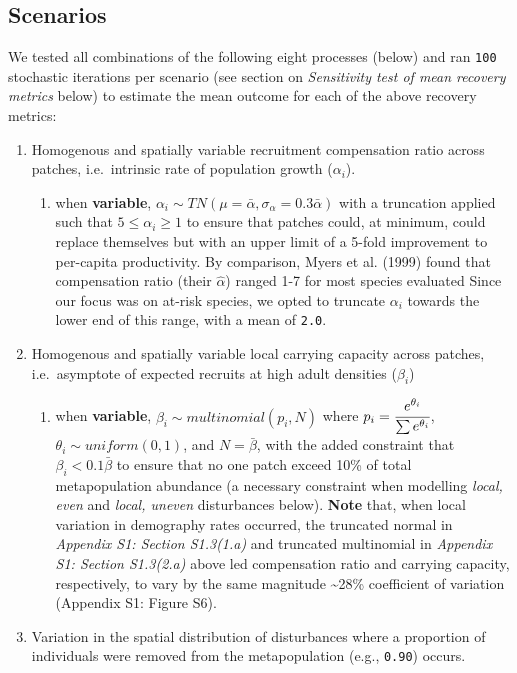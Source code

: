 \documentclass[
]{article}
\providecommand{\tightlist}{%
  \setlength{\itemsep}{0pt}\setlength{\parskip}{0pt}}
\begin{document}
\hypertarget{scenarios}{%
\subsection{Scenarios}\label{scenarios}}

We tested all combinations of the following eight processes (below) and
ran \texttt{100} stochastic iterations per scenario (see section on
\emph{Sensitivity test of mean recovery metrics} below) to estimate the
mean outcome for each of the above recovery metrics:

\begin{enumerate}
\def\labelenumi{\arabic{enumi}.}
\item
  Homogenous and spatially variable recruitment compensation ratio
  across patches, i.e.~intrinsic rate of population growth
  (\(\alpha_i\)).

  \begin{enumerate}
  \def\labelenumii{\alph{enumii}.}
  \tightlist
  \item
    when \textbf{variable},
    \(\alpha_i \sim TN(\mu=\bar{\alpha}, \sigma_{\alpha}=0.3\bar{\alpha})\)
    with a truncation applied such that \(5 \leq \alpha_i \geq 1\) to
    ensure that patches could, at minimum, could replace themselves but
    with an upper limit of a 5-fold improvement to per-capita
    productivity. By comparison, Myers et al. (1999) found that
    compensation ratio (their \(\hat\alpha\)) ranged 1-7 for most
    species evaluated Since our focus was on at-risk species, we opted
    to truncate \(\alpha_i\) towards the lower end of this range, with a
    mean of \texttt{2.0}.
  \end{enumerate}
\item
  Homogenous and spatially variable local carrying capacity across
  patches, i.e.~asymptote of expected recruits at high adult densities
  (\(\beta_i\))

  \begin{enumerate}
  \def\labelenumii{\alph{enumii}.}
  \tightlist
  \item
    when \textbf{variable}, \(\beta_i \sim multinomial(p_i,N)\) where
    \(p_i=\cfrac{e^{\theta_i}}{ \sum{e^{\theta_i}}}\),
    \(\theta_i \sim uniform(0,1)\), and \(N=\bar{\beta}\), with the
    added constraint that \(\beta_i<0.1\bar{\beta}\) to ensure that no
    one patch exceed 10\% of total metapopulation abundance (a necessary
    constraint when modelling \emph{local, even} and \emph{local,
    uneven} disturbances below). \textbf{Note} that, when local
    variation in demography rates occurred, the truncated normal in
    \emph{Appendix S1: Section S1.3(1.a)} and truncated multinomial in
    \emph{Appendix S1: Section S1.3(2.a)} above led compensation ratio
    and carrying capacity, respectively, to vary by the same magnitude
    \textasciitilde28\% coefficient of variation (Appendix S1: Figure
    S6).
  \end{enumerate}
\item
  Variation in the spatial distribution of disturbances where a
  proportion of individuals were removed from the metapopulation (e.g.,
  \texttt{0.90}) occurs.


\end{enumerate}
\end{document}
